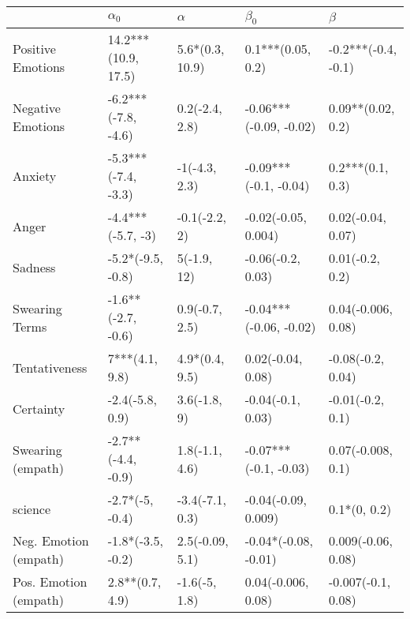 \begin{tabular}{lllll}
\toprule
{} &           $\alpha_0$ &         $\alpha$ &               $\beta_0$ &              $\beta$ \\
\midrule
Positive Emotions     &  14.2***(10.9, 17.5) &  5.6*(0.3, 10.9) &       0.1***(0.05, 0.2) &  -0.2***(-0.4, -0.1) \\
Negative Emotions     &  -6.2***(-7.8, -4.6) &   0.2(-2.4, 2.8) &  -0.06***(-0.09, -0.02) &    0.09**(0.02, 0.2) \\
Anxiety               &  -5.3***(-7.4, -3.3) &    -1(-4.3, 2.3) &   -0.09***(-0.1, -0.04) &     0.2***(0.1, 0.3) \\
Anger                 &    -4.4***(-5.7, -3) &    -0.1(-2.2, 2) &     -0.02(-0.05, 0.004) &    0.02(-0.04, 0.07) \\
Sadness               &    -5.2*(-9.5, -0.8) &      5(-1.9, 12) &       -0.06(-0.2, 0.03) &      0.01(-0.2, 0.2) \\
Swearing Terms        &   -1.6**(-2.7, -0.6) &   0.9(-0.7, 2.5) &  -0.04***(-0.06, -0.02) &   0.04(-0.006, 0.08) \\
Tentativeness         &       7***(4.1, 9.8) &   4.9*(0.4, 9.5) &       0.02(-0.04, 0.08) &    -0.08(-0.2, 0.04) \\
Certainty             &      -2.4(-5.8, 0.9) &     3.6(-1.8, 9) &       -0.04(-0.1, 0.03) &     -0.01(-0.2, 0.1) \\
Swearing (empath)     &   -2.7**(-4.4, -0.9) &   1.8(-1.1, 4.6) &   -0.07***(-0.1, -0.03) &    0.07(-0.008, 0.1) \\
science               &      -2.7*(-5, -0.4) &  -3.4(-7.1, 0.3) &     -0.04(-0.09, 0.009) &         0.1*(0, 0.2) \\
Neg. Emotion (empath) &    -1.8*(-3.5, -0.2) &  2.5(-0.09, 5.1) &    -0.04*(-0.08, -0.01) &   0.009(-0.06, 0.08) \\
Pos. Emotion (empath) &      2.8**(0.7, 4.9) &    -1.6(-5, 1.8) &      0.04(-0.006, 0.08) &   -0.007(-0.1, 0.08) \\
\bottomrule
\end{tabular}

